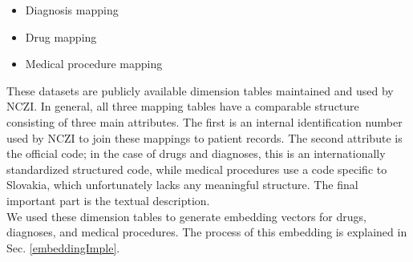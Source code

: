 \begin{itemize}
	\item Diagnosis mapping
	\item Drug mapping
	\item Medical procedure mapping
\end{itemize}

These datasets are publicly available dimension tables maintained and used by NCZI. In general, all three mapping tables have a comparable structure consisting of three main attributes. The first is an internal identification number used by NCZI to join these mappings to patient records. The second attribute is the official code; in the case of drugs and diagnoses, this is an internationally standardized structured code, while medical procedures use a code specific to Slovakia, which unfortunately lacks any meaningful structure. The final important part is the textual description.
\\

We used these dimension tables to generate embedding vectors for drugs, diagnoses, and medical procedures. The process of this embedding is explained in Sec. \ref{embeddingImple}.
